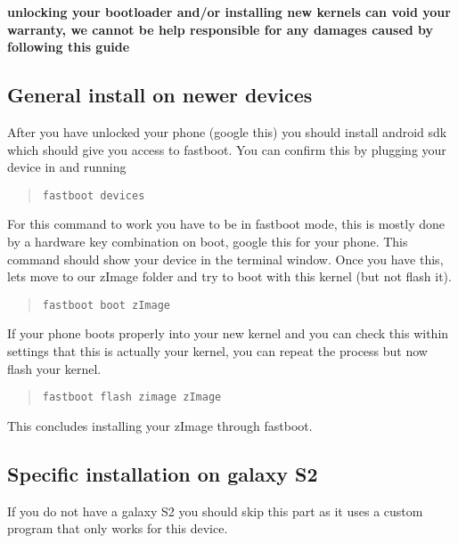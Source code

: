 \begin{warning}
\textbf{unlocking your bootloader and/or installing new kernels can void your warranty, we cannot be help responsible for any damages caused by following this guide}
\end{warning}

\subsection*{General install on newer devices}

After you have unlocked your phone (google this) you should install android sdk which should give you access to fastboot. You can confirm this by plugging your device in and running

\begin{quote} \begin{verbatim}fastboot devices \end{verbatim} \end{quote}

For this command to work you have to be in fastboot mode, this is mostly done by a hardware key combination on boot, google this for your phone. This command should show your device in the terminal window. Once you have this, lets move to our zImage folder and try to boot with this kernel (but not flash it).

\begin{quote} \begin{verbatim}fastboot boot zImage \end{verbatim} \end{quote}

If your phone boots properly into your new kernel and you can check this within settings that this is actually your kernel, you can repeat the process but now flash your kernel.

\begin{quote} \begin{verbatim}fastboot flash zimage zImage \end{verbatim} \end{quote}

This concludes installing your zImage through fastboot.

\subsection*{Specific installation on galaxy S2}

If you do not have a galaxy S2 you should skip this part as it uses a custom program that only works for this device.

